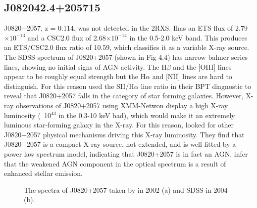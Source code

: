 \FloatBarrier

\subsection{J082042.4+205715}


J0820+2057, z = 0.114, was not detected in the 2RXS. Ihas an ETS flux of 2.79$\times 10^{-13}$ \fluxunits and a CSC2.0 flux of 2.68$\times 10^{-14}$ \fluxunits in the 0.5-2.0 keV band. 
This produces an ETS/CSC2.0 flux ratio of 10.59, which classifies it as a variable X-ray source.
The SDSS spectrum of J0820+2057 (shown in Fig 4.4) has narrow balmer series lines, showing no initial signs of AGN activity. 
The H$\beta$ and the [OIII] lines appear to be roughly equal strength but the H$\alpha$ and [NII] lines are hard to distinguish. 
For this reason \cite{jackson2012} used the SII/H$\alpha$ line ratio in their BPT diagnostic to reveal that J0820+2057 falls in the category of star forming galaxies. 
However, X-ray observations of J0820+2057 using XMM-Netwon display a high X-ray luminosity (~10$^{43}$ in the 0.3-10 keV bad), which would make it an extremely luminous star-forming galaxy in the X-ray. 
For this reason, \cite{jackson2012} looked for other J0820+2057 physical mechanisms driving this X-ray luminosity. 
They find that J0820+2057 is a compact X-ray source, not extended, and is well fitted by a power law spectrum model, indicating that J0820+2057 is in fact an AGN. 
\cite{jackson2012} infer that the weakened  AGN component in the optical spectrum is a result of enhanced stellar emission.


\begin{figure}[h]
    \centering
    \qquad
    \caption{The spectra of J0820+2057 taken by \cite{jackson2012} in 2002 (a) and SDSS in 2004 (b). }%
    \label{fig:example}%
\end{figure}



